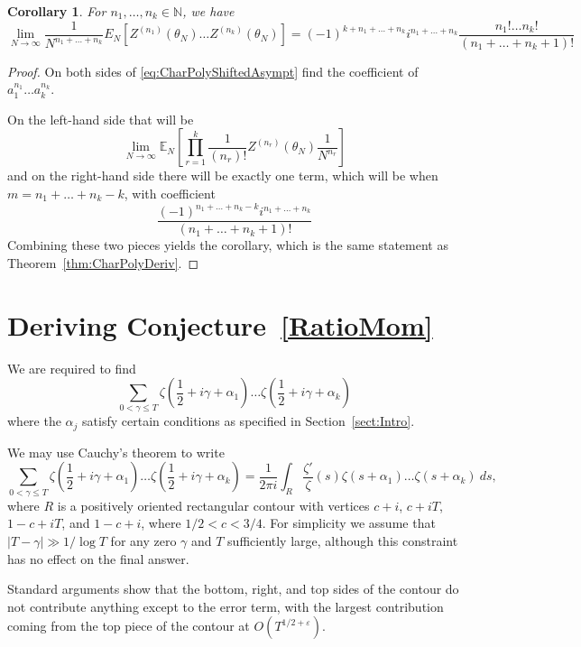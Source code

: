 \documentclass[12pt,a4paper,reqno]{amsart}
\newtheorem{corollary}{Corollary}
\theoremstyle{remark}
\numberwithin{equation}{section}
\newcommand{\E}{\mathbb{E}}
\begin{document}
\begin{corollary}
    For $n_1,\dots,n_k \in \mathbb{N}$, we have
    \[
    \lim_{N\to\infty} \frac{1}{N^{n_1+\dots+n_k}} E_N\left[Z^{(n_1)}(\theta_N) \dots Z^{(n_k)}(\theta_N)\right] = (-1)^{k+n_1+\dots+n_k} i^{n_1+\dots+n_k} \frac{n_1! \dots n_k!}{(n_1+\dots+n_k+1)!}
    \]
\end{corollary}

\begin{proof}
On both sides of \eqref{eq:CharPolyShiftedAsympt} find the coefficient of $a_1^{n_1} \dots a_k^{n_k}$.

On the left-hand side that will be
\[
\lim_{N\to\infty} \E_N\left[ \prod_{r=1}^k \frac{1}{(n_r)!} Z^{(n_r)}(\theta_N) \frac{1}{N^{n_r}} \right]
\]
and on the right-hand side there will be exactly one term, which will be when $m=n_1+\dots+n_k-k$, with coefficient
\[
\frac{(-1)^{n_1+\dots+n_k-k} i^{n_1+\dots+n_k} }{(n_1+\dots+n_k+1)!}
\]
Combining these two pieces yields the corollary, which is the same statement as Theorem~\ref{thm:CharPolyDeriv}.
\end{proof}




\section{Deriving Conjecture~\ref{RatioMom}}\label{ProofConj3}
We are required to find
\begin{equation*}
    \sum_{0 < \gamma \leq T}  \zeta \left( \frac{1}{2} + i \gamma + \alpha_1 \right)\dots\zeta \left( \frac{1}{2} + i \gamma + \alpha_k \right)
\end{equation*}
where the $\alpha_j$ satisfy certain conditions as specified in Section~\ref{sect:Intro}.

We may use Cauchy's theorem to write
\[
   \sum_{0 < \gamma \leq T}  \zeta \left( \frac{1}{2} + i \gamma + \alpha_1 \right)\dots\zeta \left( \frac{1}{2} + i \gamma + \alpha_k \right) = \frac{1}{2 \pi i} \int_{R} \frac{\zeta '}{\zeta} (s) \zeta \left( s + \alpha_1 \right)\dots\zeta \left( s + \alpha_k \right) \ ds,
\]
where $R$ is a positively oriented rectangular contour with vertices $c+i$, $c+iT$, $1-c+iT$, and $1-c+i$, where $1/2 < c < 3/4$. For simplicity we assume that $|T-\gamma| \gg 1/\log T$ for any zero $\gamma$ and $T$ sufficiently large, although this constraint has no effect on the final answer.

Standard arguments show that the bottom, right, and top sides of the contour do not contribute anything except to the error term, with the largest contribution coming from the top piece of the contour at $O\left(T^{1/2+\varepsilon}\right)$.
\end{document}

